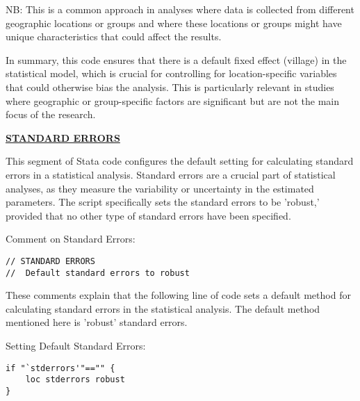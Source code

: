 \documentclass{article}
\begin{document}
NB: This is a common approach in analyses where data is collected from different geographic locations or groups and where these locations or groups might have unique characteristics that could affect the results. \newline

\vspace{0.3cm} In summary, this code ensures that there is a default fixed effect (village) in the statistical model, which is crucial for controlling for location-specific variables that could otherwise bias the analysis. This is particularly relevant in studies where geographic or group-specific factors are significant but are not the main focus of the research.


\underline{\textbf{STANDARD ERRORS}}

\vspace{0.3cm}This segment of Stata code configures the default setting for calculating standard errors in a statistical analysis. Standard errors are a crucial part of statistical analyses, as they measure the variability or uncertainty in the estimated parameters. The script specifically sets the standard errors to be 'robust,' provided that no other type of standard errors have been specified.\newline

Comment on Standard Errors:


\begin{mdframed}
\begin{verbatim}
// STANDARD ERRORS 
//	Default standard errors to robust
\end{verbatim}
\end{mdframed}

These comments explain that the following line of code sets a default method for calculating standard errors in the statistical analysis. The default method mentioned here is 'robust' standard errors. \newline

Setting Default Standard Errors:


\begin{mdframed}
\begin{verbatim}
if "`stderrors'"=="" {
    loc stderrors robust 
}
\end{verbatim}
\end{mdframed}
\end{document}
